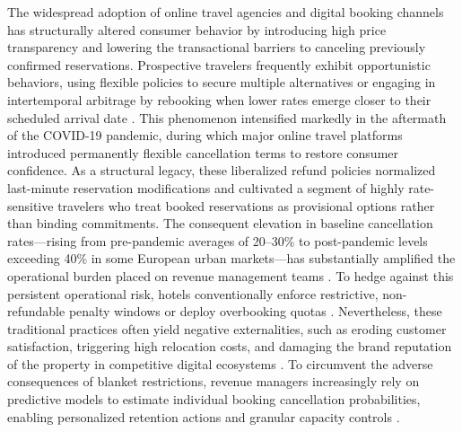 \documentclass[pdflatex,sn-mathphys-ay]{sn-jnl}
\theoremstyle{thmstyleone}%
\theoremstyle{thmstyletwo}%
\theoremstyle{thmstylethree}%
\begin{document}
The widespread adoption of online travel agencies and digital booking channels has structurally altered consumer behavior by introducing high price transparency and lowering the transactional barriers to canceling previously confirmed reservations. Prospective travelers frequently exhibit opportunistic behaviors, using flexible policies to secure multiple alternatives \citep{chen2023prediction} or engaging in intertemporal arbitrage by rebooking when lower rates emerge \citep{mir2026decoding} closer to their scheduled arrival date \citep{ampountolas2025predicting}. This phenomenon intensified markedly in the aftermath of the COVID-19 pandemic, during which major online travel platforms introduced permanently flexible cancellation terms to restore consumer confidence. As a structural legacy, these liberalized refund policies normalized last-minute reservation modifications and cultivated a segment of highly rate-sensitive travelers who treat booked reservations as provisional options rather than binding commitments. The consequent elevation in baseline cancellation rates—rising from pre-pandemic averages of 20–30\% to post-pandemic levels exceeding 40\% in some European urban markets—has substantially amplified the operational burden placed on revenue management teams \citep{mir2026decoding}. To hedge against this persistent operational risk, hotels conventionally enforce restrictive, non-refundable penalty windows \citep{yang2024predicting} or deploy overbooking quotas \citep{antonio2017predicting}. Nevertheless, these traditional practices often yield negative externalities, such as eroding customer satisfaction, triggering high relocation costs, and damaging the brand reputation of the property in competitive digital ecosystems \citep{falk2018modelling}. To circumvent the adverse consequences of blanket restrictions, revenue managers increasingly rely on predictive models to estimate individual booking cancellation probabilities, enabling personalized retention actions and granular capacity controls \citep{antonio2017predicting, liu2023hospitality, talal2025hotel}.
\end{document}
